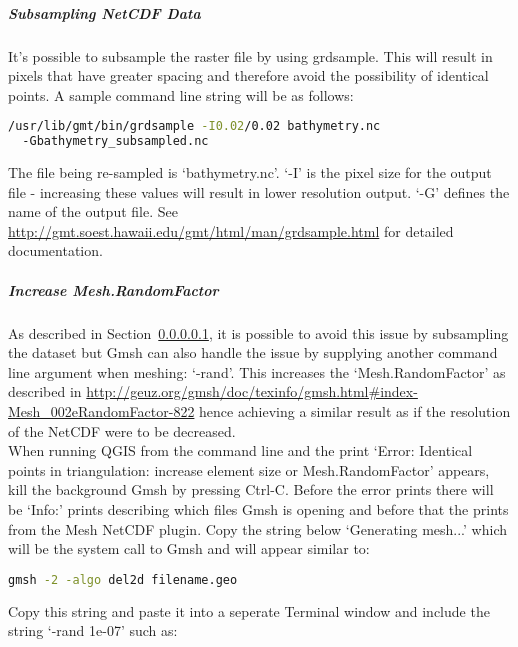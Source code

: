 \subparagraph{Subsampling NetCDF Data \\}
\label{sec:mn_subsample}
It's possible to subsample the raster file by using grdsample. This will result in pixels that have greater spacing and therefore avoid the possibility of identical points. A sample command line string will be as follows:

\begin{example}
  \begin{lstlisting}[language=bash]
  /usr/lib/gmt/bin/grdsample -I0.02/0.02 bathymetry.nc
  -Gbathymetry_subsampled.nc
  \end{lstlisting}
\end{example}

The file being re-sampled is `bathymetry.nc'. `-I' is the pixel size for the output file - increasing these values will result in lower resolution output. `-G' defines the name of the output file. See \url{http://gmt.soest.hawaii.edu/gmt/html/man/grdsample.html} for detailed documentation.


\subparagraph{Increase Mesh.RandomFactor \\}
\label{sec:mn_meshRandomFactor}
As described in Section~\ref{sec:mn_subsample}, it is possible to avoid this issue by subsampling the dataset but Gmsh can also handle the issue by supplying another command line argument when meshing: `-rand'. This increases the `Mesh.RandomFactor' as described in \url{http://geuz.org/gmsh/doc/texinfo/gmsh.html#index-Mesh_002eRandomFactor-822} hence achieving a similar result as if the resolution of the NetCDF were to be decreased. \\

When running QGIS from the command line and the print `Error: Identical points in triangulation: increase element size or Mesh.RandomFactor' appears, kill the background Gmsh by pressing Ctrl-C. Before the error prints there will be `Info:' prints describing which files Gmsh is opening and before that the prints from the Mesh NetCDF plugin. Copy the string below `Generating mesh...' which will be the system call to Gmsh and will appear similar to:

\begin{example}
  \begin{lstlisting}[language=bash]
  gmsh -2 -algo del2d filename.geo
  \end{lstlisting}
\end{example}

Copy this string and paste it into a seperate Terminal window and include the string `-rand 1e-07' such as: 

